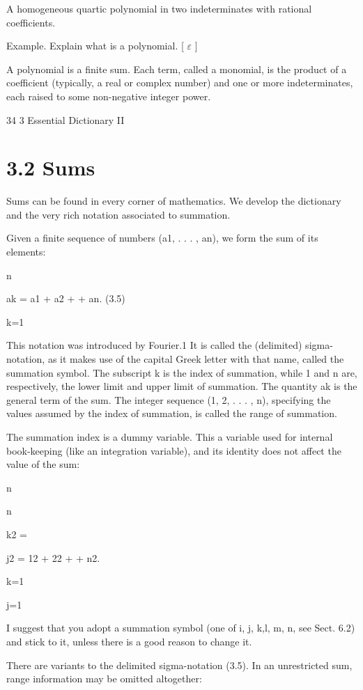 \documentclass[11pt]{article}
\theoremstyle{plain}
\theoremstyle{definition}
\begin{document}
A homogeneous quartic polynomial in two indeterminates with rational coefficients.

Example. Explain what is a polynomial. [ $\varepsilon$ ]

A polynomial is a finite sum. Each term, called a monomial, is the product of a coefficient (typically, a real or complex number) and one or more indeterminates, each raised to some non-negative integer power.

34 3 Essential Dictionary II

\section{3.2 Sums}

Sums can be found in every corner of mathematics. We develop the dictionary and the very rich notation associated to summation.

Given a finite sequence of numbers (a1, . . . , an), we form the sum of its elements:

n

ak = a1 + a2 + \textperiodcentered{} \textperiodcentered{} \textperiodcentered{} + an. (3.5)

k=1

This notation was introduced by Fourier.1 It is called the (delimited) sigma-notation, as it makes use of the capital Greek letter with that name, called the summation symbol. The subscript k is the index of summation, while 1 and n are, respectively, the lower limit and upper limit of summation. The quantity ak is the general term of the sum. The integer sequence (1, 2, . . . , n), specifying the values assumed by the index of summation, is called the range of summation.

The summation index is a dummy variable. This a variable used for internal book-keeping (like an integration variable), and its identity does not affect the value of the sum:

n

n

k2 =

j2 = 12 + 22 + \textperiodcentered{} \textperiodcentered{} \textperiodcentered{} + n2.

k=1

j=1

I suggest that you adopt a summation symbol (one of i, j, k,l, m, n, see Sect. 6.2) and stick to it, unless there is a good reason to change it.

There are variants to the delimited sigma-notation (3.5). In an unrestricted sum, range information may be omitted altogether:
\end{document}
